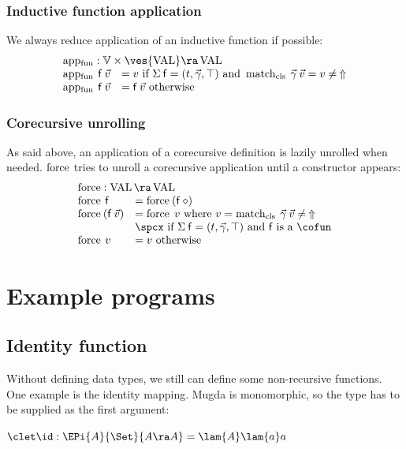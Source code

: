 \subsubsection{Inductive function application}
We always reduce application of an inductive function if possible:\[
\begin{array}{ll}
\multicolumn{2}{l}{\apf : \cV \times \ves{\Val} \ra \Val}\\
\apf \: \ff \: \vec{v} & = v \mbox{ if } \Sig \: \ff = (t,\vec{\gamma},\top) \mbox { and } \matchcls \: \vec{\gamma} \: \vec{v} = v \neq \: \stuck \\ 
\apf \: \ff \: \vec{v} & = \ff \: \vec{v} \mbox { otherwise } 
\end{array}
\]

\subsubsection{Corecursive unrolling}
As said above, an application of a corecursive definition is lazily unrolled when needed.
$\operatorname{force}$ tries to unroll a corecursive application until a constructor appears:
\[
\begin{array}{ll}
\multicolumn{2}{l}{\forc : \Val \ra \Val }\\
\forc \: \ff & = \forc \: (\ff \: \diamond) \\
\forc \: (\ff \: \vec{v}) & = \forc \; v \mbox{ where } v = \matchcls \: \vec{\gamma} \: \vec{v} \neq \: \stuck\\
& \spcx \mbox{ if } \Sig \: \ff = (t,\vec{\gamma},\top) \mbox { and } \ff \mbox { is a } \cofun\\ 
\forc \: v & = v \mbox{ otherwise}
\end{array}
\]

\section{Example programs}

\subsection{Identity function}
Without defining data types, we still can define some non-recursive functions.
One example is the identity mapping. 
Mugda is monomorphic, so the type has to be supplied as the first argument:
\begin{bsp}
$\clet \id : \EPi{A}{\Set}{A \ra A} = \lam{A}\lam{a}a$   
\end{bsp}

